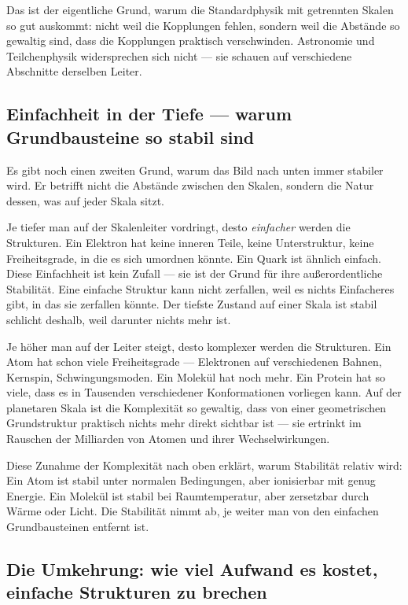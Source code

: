 Das ist der eigentliche Grund, warum die Standardphysik mit getrennten
Skalen so gut auskommt: nicht weil die Kopplungen fehlen, sondern weil
die Abstände so gewaltig sind, dass die Kopplungen praktisch
verschwinden. Astronomie und Teilchenphysik widersprechen sich nicht
--- sie schauen auf verschiedene Abschnitte derselben Leiter.

\subsection*{Einfachheit in der Tiefe --- warum Grundbausteine so stabil sind}

Es gibt noch einen zweiten Grund, warum das Bild nach unten immer
stabiler wird. Er betrifft nicht die Abstände zwischen den Skalen,
sondern die Natur dessen, was auf jeder Skala sitzt.

Je tiefer man auf der Skalenleiter vordringt, desto \emph{einfacher}
werden die Strukturen. Ein Elektron hat keine inneren Teile, keine
Unterstruktur, keine Freiheitsgrade, in die es sich umordnen könnte.
Ein Quark ist ähnlich einfach. Diese Einfachheit ist kein Zufall ---
sie ist der Grund für ihre außerordentliche Stabilität. Eine einfache
Struktur kann nicht zerfallen, weil es nichts Einfacheres gibt, in das
sie zerfallen könnte. Der tiefste Zustand auf einer Skala ist stabil
schlicht deshalb, weil darunter nichts mehr ist.

Je höher man auf der Leiter steigt, desto komplexer werden die
Strukturen. Ein Atom hat schon viele Freiheitsgrade --- Elektronen auf
verschiedenen Bahnen, Kernspin, Schwingungsmoden. Ein Molekül hat noch
mehr. Ein Protein hat so viele, dass es in Tausenden verschiedener
Konformationen vorliegen kann. Auf der planetaren Skala ist die
Komplexität so gewaltig, dass von einer geometrischen Grundstruktur
praktisch nichts mehr direkt sichtbar ist --- sie ertrinkt im Rauschen
der Milliarden von Atomen und ihrer Wechselwirkungen.

Diese Zunahme der Komplexität nach oben erklärt, warum Stabilität
relativ wird: Ein Atom ist stabil unter normalen Bedingungen, aber
ionisierbar mit genug Energie. Ein Molekül ist stabil bei
Raumtemperatur, aber zersetzbar durch Wärme oder Licht. Die Stabilität
nimmt ab, je weiter man von den einfachen Grundbausteinen entfernt ist.

\subsection*{Die Umkehrung: wie viel Aufwand es kostet, einfache Strukturen zu brechen}

